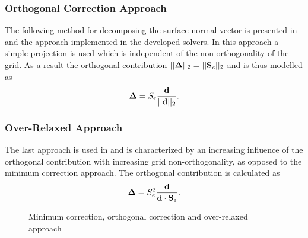       \subsubsection{Orthogonal Correction Approach}
      \label{seq:orthcorrapproach}

      The following method for decomposing the surface normal vector is presented in \cite{ferziger02} and the approach implemented in the developed solvers. In this approach a simple projection is used which is independent of the non-orthogonality of the grid. As a result the orthogonal contribution \(||\boldsymbol{\Delta}||_2 =  ||\mathbf{S}_e||_2\) and is thus modelled as 
      \begin{displaymath}
        \boldsymbol{\Delta} =  S_e \frac{\mathbf{d}}{ ||\mathbf{d}||_2}.
      \end{displaymath}

      \subsubsection{Over-Relaxed Approach}

      The last approach is used in \cite{jasak96,darwish09} and is characterized by an increasing influence of the orthogonal contribution with increasing grid non-orthogonality, as opposed to the minimum correction approach. The orthogonal contribution is calculated as
      \begin{displaymath}
        \boldsymbol{\Delta} =  S_e^2 \frac{\mathbf{d}}{ \mathbf{d} \cdot \mathbf{S}_e }.
      \end{displaymath} 

      \begin{figure}[h]
      \label{fig:nonorth}
      \qquad
      \caption{Minimum correction, orthogonal correction and over-relaxed approach}
      \end{figure}

